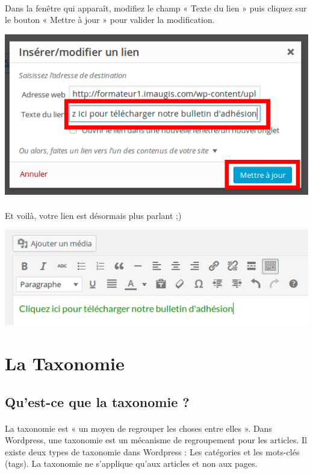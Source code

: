 \documentclass[10pt,a4paper]{article}
\begin{document}
\paragraph{}Dans la fenêtre qui apparaît, modifiez le champ « Texte du lien » puis cliquez sur le bouton « Mettre à jour » pour valider la modification.
\begin{center}
\includegraphics[scale=0.3]{img/0087.png}
\end{center}
\paragraph{}Et voilà, votre lien est désormais plus parlant ;)
\begin{center}
\includegraphics[scale=0.3]{img/0088.png}
\end{center}
\newpage

\section{La Taxonomie}
\subsection{Qu'est-ce que la taxonomie ?}
\paragraph{}La taxonomie est « un moyen de regrouper les choses entre elles ». Dans Wordpress, une taxonomie est un mécanisme de regroupement pour les articles. Il existe deux types de taxonomie dans Wordpress : Les catégories et les mots-clés (tags). La taxonomie ne s'applique qu'aux articles et non aux pages.
\end{document}
